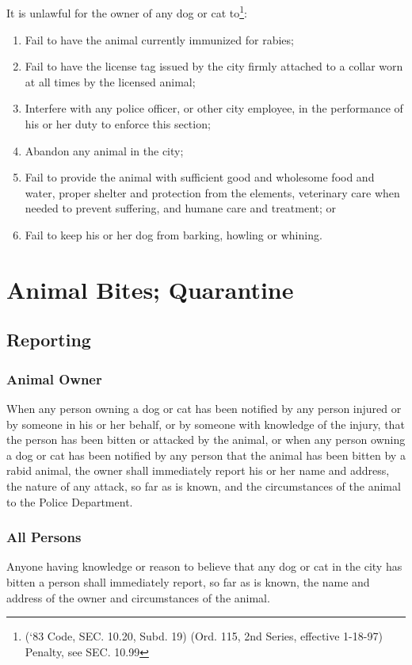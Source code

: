 \subsection{}
It is unlawful for the owner of any dog or cat to\footnote{(‘83 Code, SEC. 10.20, Subd. 19)  (Ord. 115, 2nd Series, effective 1-18-97)  Penalty, see SEC. 10.99}:
\begin{enumerate}[{\indent}1)]
    \item Fail to have the animal currently immunized for rabies;
    \item Fail to have the license tag issued by the city firmly attached to a collar worn at all times by the licensed animal;
    \item Interfere with any police officer, or other city employee, in the performance of his or her duty to enforce this section;
    \item Abandon any animal in the city;
    \item Fail to provide the animal with sufficient good and wholesome food and water, proper shelter and protection from the elements, veterinary care when needed to prevent suffering, and humane care and treatment; or 
    \item Fail to keep his or her dog from barking, howling or whining.
\end{enumerate}

\section{Animal Bites; Quarantine}
\subsection{Reporting}
\subsubsection{Animal Owner}
When any person owning a dog or cat has been notified by any person injured or by someone in his or her behalf, or by someone with knowledge of the injury, that the person has been bitten or attacked by the animal, or when any person owning a dog or cat has been notified by any person that the animal has been bitten by a rabid animal, the owner shall immediately report his or her name and address, the nature of any attack, so far as is known, and the circumstances of the animal to the Police Department.
\subsubsection{All Persons}
Anyone having knowledge or reason to believe that any dog or cat in the city has bitten a person shall immediately report, so far as is known, the name and address of the owner and circumstances of the animal.

